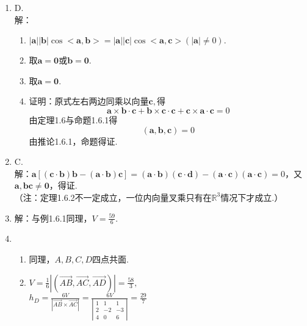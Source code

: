 \documentclass[UTF8]{ctexart}
\begin{document}
\begin{enumerate}
\item D.\\
解：\begin{enumerate}[(A.)]
\item $\left|\mathbf{a}\right|\left|\mathbf{b}\right|\cos<\mathbf{a},\mathbf{b}>=\left|\mathbf{a}\right|\left|\mathbf{c}\right|\cos<\mathbf{a},\mathbf{c}>\left(\left|\mathbf{a}\right|\neq0\right).$
\item 取$\mathbf{a}=\mathbf{0}$或$\mathbf{b}=\mathbf{0}.$
\item 取$\mathbf{a}=\mathbf{0}.$
\item 证明：原式左右两边同乘以向量$\mathbf{c},$得$$\mathbf{a}\times\mathbf{b}\cdot\mathbf{c}+\mathbf{b}\times\mathbf{c}\cdot\mathbf{c}+\mathbf{c}\times\mathbf{a}\cdot\mathbf{c}=0$$由定理1.6与命题1.6.1得$$\left(\mathbf{a},\mathbf{b},\mathbf{c}\right)=0$$由推论1.6.1，命题得证. \end{enumerate}

\item C.\\
解：$\mathbf{a}\left[\left(\mathbf{c}\cdot\mathbf{b}\right)\mathbf{b}-\left(\mathbf{a}\cdot\mathbf{b}\right)\mathbf{c}\right]=\left(\mathbf{a}\cdot\mathbf{b}\right)\left(\mathbf{c}\cdot\mathbf{d}\right)-\left(\mathbf{a}\cdot\mathbf{c}\right)\left(\mathbf{a}\cdot\mathbf{c}\right)=0$，又$\mathbf{a},\mathbf{b}\mathbf{c}\neq\mathbf{0}$，得证.\\
（注：定理1.6.2不一定成立，一位内向量叉乘只有在$\mathbb{R}^3$情况下才成立.）

\item 解：与例1.6.1同理，$V=\displaystyle\frac{59}{6}$.

\item \begin{enumerate}[(1)]
\item 同理，$A,B,C,D$四点共面. 
\item $V=\displaystyle\frac{1}{6}\left|\left(\overrightarrow{AB},\overrightarrow{AC},\overrightarrow{AD}\right)\right|=\displaystyle\frac{58}{3},$\\
$h_D=\displaystyle\frac{6V}{\left|\overrightarrow{AB}\times\overrightarrow{AC}\right|}=\displaystyle\frac{6V}{\left|\begin{array}{ccc}1&1&1\\2&-2&-3\\4&0&6\end{array}\right|}=\displaystyle\frac{29}{7}$
\end{enumerate}


\end{enumerate}
\end{document}
